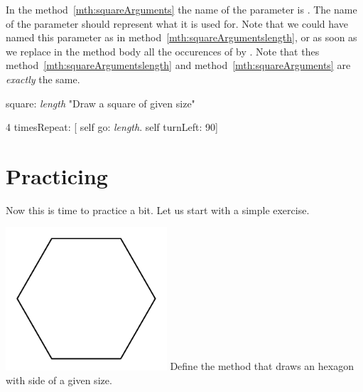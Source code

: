 In the method~\ref{mth:squareArguments} the name of the parameter is . The name of the parameter should represent what it is used for. Note that we could have named this parameter  as in method~\ref{mth:squareArgumentslength}, or  as soon as we replace in the method body all the occurences of  by . Note that  thes method~\ref{mth:squareArgumentslength} and  method~\ref{mth:squareArguments} are \emph{exactly} the same.

\begin{method}\label{mth:squareArgumentslength}
square: \emph{length}
   "Draw a square of given size"

   4 timesRepeat: 
                    [ self go: \emph{length}.
                    self turnLeft: 90]
\end{method}


\section{Practicing}
Now this is time to practice a bit. Let us start with a simple exercise.

\begin{exofigwithsizeandtitle}[0.5]{\includegraphics[width=6cm]{ArgHexagon}}{}
  Define the method  that draws an hexagon with side of a given size.
\end{exofigwithsizeandtitle}

